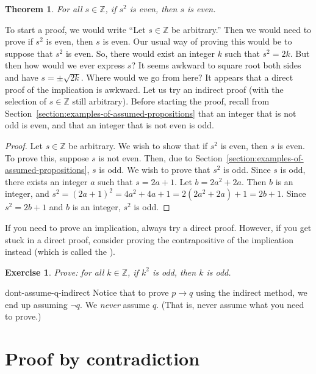 \documentclass{book}
\newcounter{ekcounter}%
\theoremstyle{ekimcustom}
\newtheorem{theorem}[ekcounter]{Theorem}
\newtheorem{exercise}[ekcounter]{Exercise}
\newcommand\defn[1]{{\color{blue}{\bf #1}}}
\begin{document}
\begin{theorem}\label{theorem:s2-even-s-even}
For all $s \in \mathbb{Z}$, if $s^2$ is even, then $s$ is even.
\end{theorem}
To start a proof, we would write ``Let $s \in \mathbb{Z}$ be arbitrary.'' Then we would need to prove if $s^2$ is even, then $s$ is even. Our usual way of proving this would be to suppose that $s^2$ is even. So, there would exist an integer $k$ such that $s^2=2k$. But then how would we ever express $s$? It seems awkward to square root both sides and have $s=\pm\sqrt{2k}$. Where would we go from here? It appears that a direct proof of the implication is awkward. Let us try an indirect proof (with the selection of $s \in \mathbb{Z}$ still arbitrary). Before starting the proof, recall from Section~\ref{section:examples-of-assumed-propositions} that an integer that is not odd is even, and that an integer that is not even is odd.
\begin{proof}
Let $s \in \mathbb{Z}$ be arbitrary. We wish to show that if $s^2$ is even, then $s$ is even. To prove this, suppose $s$ is not even. Then, due to Section~\ref{section:examples-of-assumed-propositions}, $s$ is odd. We wish to prove that $s^2$ is odd. Since $s$ is odd, there exists an integer $a$ such that $s=2a+1$. Let $b = 2a^2+2a$. Then $b$ is an integer, and $s^2=(2a+1)^2=4a^2+4a+1=2(2a^2+2a)+1=2b+1$. Since $s^2=2b+1$ and $b$ is an integer, $s^2$ is odd. 
\end{proof}

If you need to prove an implication, always try a direct proof. However, if you get stuck in a direct proof, consider proving the contrapositive of the implication instead (which is called the \defn{indirect proof}).

\begin{exercise}
Prove: for all $k \in \mathbb{Z}$, if $k^2$ is odd, then $k$ is odd.
\end{exercise}

\begin{bwarning}{}{dont-assume-q-indirect}
Notice that to prove $p \to q$ using the indirect method, we end up assuming $\neg q$. We \emph{never} assume $q$. (That is, never assume what you need to prove.)
\end{bwarning}

\section{Proof by contradiction}\label{section:proof-by-contradiction}
\end{document}
